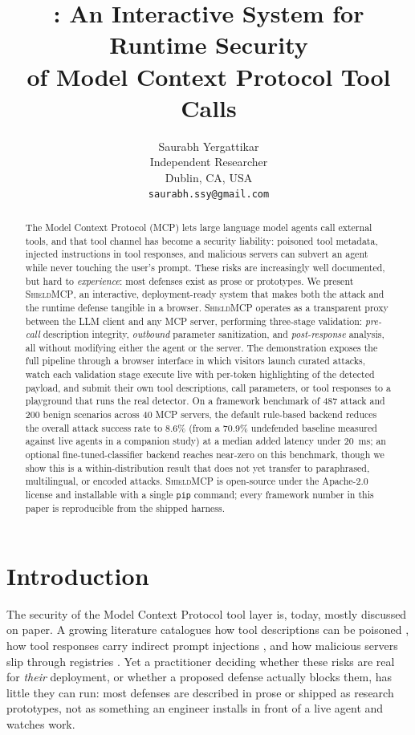 \documentclass[11pt]{article}
\title{\shield{}: An Interactive System for Runtime Security\\of Model Context Protocol Tool Calls}
\author{Saurabh Yergattikar \\
  Independent Researcher \\
  Dublin, CA, USA \\
  \texttt{saurabh.ssy@gmail.com}}
\newcommand{\shield}{\textsc{ShieldMCP}}
\begin{document}
\maketitle

\begin{abstract}
The Model Context Protocol (MCP) lets large language model agents call external
tools, and that tool channel has become a security liability: poisoned tool
metadata, injected instructions in tool responses, and malicious servers can
subvert an agent while never touching the user's prompt. These risks are
increasingly well documented, but hard to \emph{experience}: most defenses exist as
prose or prototypes. We present \shield{}, an interactive, deployment-ready system
that makes both the attack and the runtime defense tangible in a browser. \shield{}
operates as a transparent proxy between the LLM client and any MCP server,
performing three-stage validation: \emph{pre-call} description integrity,
\emph{outbound} parameter sanitization, and \emph{post-response} analysis, all
without modifying either the agent or the server. The demonstration exposes the full
pipeline through a browser interface in which visitors launch curated attacks, watch
each validation stage execute live with per-token highlighting of the detected
payload, and submit their own tool descriptions, call parameters, or tool responses
to a playground that runs the real detector. On a framework benchmark of 487 attack
and 200 benign scenarios across 40 MCP servers, the default rule-based backend
reduces the overall attack success rate to 8.6\% (from a 70.9\% undefended baseline
measured against live agents in a companion study) at a median added latency under
20~ms; an optional fine-tuned-classifier backend reaches near-zero on this
benchmark, though we show this is a within-distribution result that does not yet
transfer to paraphrased, multilingual, or encoded attacks. \shield{} is open-source
under the Apache-2.0 license and installable with a single \texttt{pip} command;
every framework number in this paper is reproducible from the shipped harness.
\end{abstract}

\section{Introduction}

The security of the Model Context Protocol \citep[MCP;][]{mcp2025} tool layer is,
today, mostly discussed on paper. A growing literature catalogues how tool
descriptions can be poisoned \citep{wang2025mcptox}, how tool responses carry
indirect prompt injections \citep{greshake2023,an2025ipiguard}, and how malicious
servers slip through registries \citep{song2025beyond,zhao2025mcpservers}. Yet a
practitioner deciding whether these risks are real for \emph{their} deployment, or
whether a proposed defense actually blocks them, has little they can run: most
defenses are described in prose or shipped as research prototypes, not as something
an engineer installs in front of a live agent and watches work.
\end{document}
